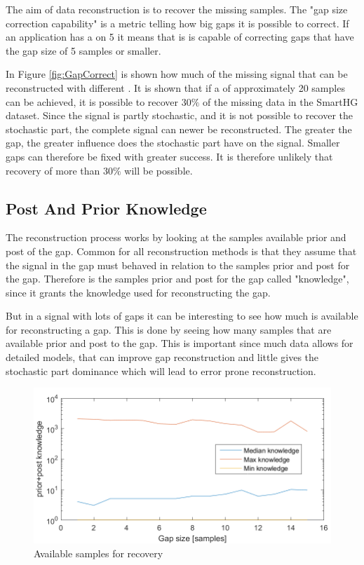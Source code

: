 The aim of data reconstruction is to recover the missing samples. The "gap size correction capability" is a metric telling how big gaps it is possible to correct. If an application has a  on 5 it means that is is capable of correcting gaps that have the gap size of 5 samples or smaller. 

In Figure \ref{fig:GapCorrect} is shown how much of the missing signal that can be reconstructed with different . It is shown that if a  of approximately 20 samples can be achieved, it is possible to recover $30\%$ of the missing data in the SmartHG dataset. Since the signal is partly stochastic, and it is not possible to recover the stochastic part, the complete signal can newer be reconstructed. The greater the gap, the greater influence does the stochastic part have on the signal. Smaller gaps can therefore be fixed with greater success. It is therefore unlikely that recovery of more than $30\%$ will be possible. 

\subsection{Post And Prior Knowledge}
The reconstruction process works by looking at the samples available prior and post of the gap. Common for all reconstruction methods is that they assume that the signal in the gap must behaved in relation to the samples prior and post for the gap. Therefore is the samples prior and post for the gap called "knowledge", since it grants the knowledge used for reconstructing the gap. 

But in a signal with lots of gaps it can be interesting to see how much  is available for reconstructing a gap. This is done by seeing how many samples that are available prior and post to the gap. This is important since much data allows for detailed models, that can improve gap reconstruction and little  gives the stochastic part dominance which will lead to error prone reconstruction. 

\begin{figure}[H]
\centering
\includegraphics[width=0.7\linewidth]{billeder/GapInfo2.png}\caption{Available samples for recovery}
\label{fig:PAF}
\end{figure}

